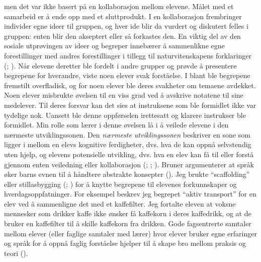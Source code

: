 \documentclass[main.tex]{subfiles}
\begin{document}
men det var ikke basert på en kollaborasjon mellom elevene. Målet med et samarbeid er å ende opp 
med et sluttprodukt. I en kollaborasjon frembringer individer egne ideer til gruppen, og hver ide
blir da vurdert og diskutert felles i gruppen: enten blir den akseptert eller så forkastes den.
En viktig del av den sosiale utprøvingen av ideer og begreper innebærer å sammenlikne egne 
forestillinger med andres forestillinger i tillegg til naturvitenskapens forklaringer 
(; ).
\newline
\newline
Når elevene deretter ble fordelt i andre grupper og prøvde å presentere begrepene for hverandre, 
viste noen elever svak forståelse. I blant ble begrepene fremstilt overfladisk, og for noen elever 
ble deres svakheter om temaene avdekket. Noen elever misbrukte øvelsen til en viss grad ved å 
avskrive notatene til sine medelever. Til deres forsvar kan det sies at instruksene som ble formidlet 
ikke var tydelige nok. Uansett ble denne oppførselen irettesatt og klarere instrukser ble formidlet.
\newline
\newline
Min rolle som lærer i denne øvelsen lå i å veilede elevene i den nærmeste utviklingssonen.
Den \emph{nærmeste utviklingssonen} beskriver en sone som ligger i mellom en elevs kognitive 
ferdigheter, dvs. hva de kan oppnå selvstendig uten hjelp, og elevens potensielle utvikling, dvs. 
hva en elev kan få til eller forstå gjennom enten veiledning eller kollaborasjon 
(; ; ). Bruner argumenterer at 
språk øker barns evnen til å håndtere abstrakte konsepter (). Jeg brukte ``scaffolding'' 
eller stillasbygging (; ) for å knytte begrepene til elevenes 
forkunnskaper og hverdagsoppfatninger. For eksempel beskrev jeg begrepet ``aktiv transport'' for
en elev ved å sammenligne det med et kaffefilter. Jeg fortalte eleven at voksne mennesker som 
drikker kaffe ikke ønsker få kaffekorn i deres kaffedrikk, og at de bruker en kaffefilter til å
skille kaffekorn fra drikken. Gode fagsentrerte samtaler mellom elever (eller faglige 
samtaler med lærer) hvor elever bruker egne erfaringer og språk for å oppnå faglig forståelse 
hjelper til å skape bro mellom praksis og teori ().
\end{document}
